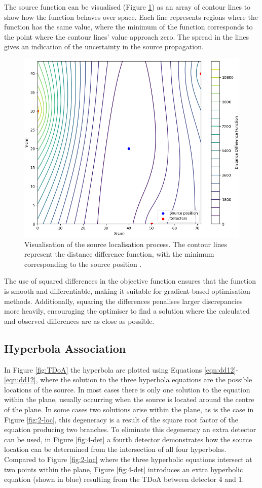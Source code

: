 The source function can be visualised (Figure \ref{fig:source-func}) as an array of contour lines to show how the function behaves over space. Each line represents regions where the function has the same value, where the minimum of the function corresponds to the point where the contour lines' value approach zero. The spread in the lines gives an indication of the uncertainty in the source propagation.

\begin{figure}
    \centering
    \includegraphics[width=0.75\linewidth]{images/source-func.png}
    \caption{Visualisation of the source localisation process. The contour lines represent the distance difference function, with the minimum corresponding to the source position \cite{boxer_2025_15041819}.}
    \label{fig:source-func}
\end{figure}

The use of squared differences in the objective function ensures that the function is smooth and differentiable, making it suitable for gradient-based optimisation methods. Additionally, squaring the differences penalises larger discrepancies more heavily, encouraging the optimiser to find a solution where the calculated and observed differences are as close as possible.

\subsection{Hyperbola Association}
\label{sec:hyp-ass}

In Figure \ref{fig:TDoA} the hyperbola are plotted using Equations \ref{eqn:dd12}-\ref{eqn:dd12}, where the solution to the three hyperbola equations are the possible locations of the source. In most cases there is only one solution to the equation within the plane, usually occurring when the source is located around the centre of the plane. In some cases two solutions arise within the plane, as is the case in Figure \ref{fig:2-loc}, this degeneracy is a result of the square root factor of the equation producing two branches. To eliminate this degeneracy an extra detector can be used, in Figure \ref{fig:4-det} a fourth detector demonstrates how the source location can be determined from the intersection of all four hyperbolas. Compared to Figure \ref{fig:2-loc} where the three hyperbolic equations intersect at two points within the plane, Figure \ref{fig:4-det} introduces an extra hyperbolic equation (shown in blue) resulting from the TDoA between detector 4 and 1.


